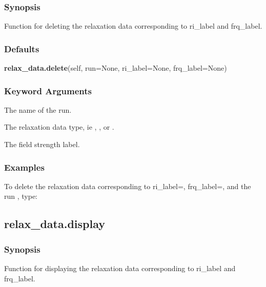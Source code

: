 \subsubsection{Synopsis}

Function for deleting the relaxation data corresponding to ri\_label and frq\_label.



\subsubsection{Defaults}

\textsf{\textbf{relax\_data.delete}(self, run=None, ri\_label=None, frq\_label=None)}


\subsubsection{Keyword Arguments}

  The name of the run. 

  The relaxation data type, ie , , or . 

  The field strength label. 




\subsubsection{Examples}

To delete the relaxation data corresponding to ri\_label=, frq\_label=, and the run , type:





\newpage

\subsection{relax\_data.display}


\subsubsection{Synopsis}

Function for displaying the relaxation data corresponding to ri\_label and frq\_label.



